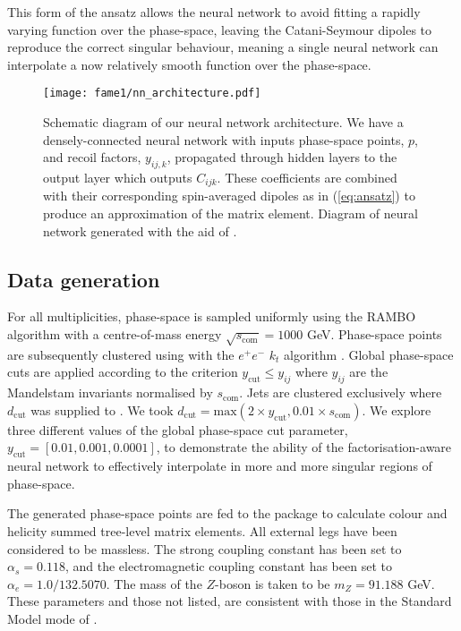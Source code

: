 \documentclass[main.tex]{subfiles}
\begin{document}
This form of the ansatz allows the neural network to avoid fitting a rapidly varying function over the phase-space, leaving the Catani-Seymour dipoles to reproduce the correct singular behaviour, meaning a single neural network can interpolate a now relatively smooth function over the phase-space.

\begin{figure}
    \texttt{[image: fame1/nn\_architecture.pdf]}
    \caption{Schematic diagram of our neural network architecture.
    We have a densely-connected neural network with inputs phase-space points, $p$, and recoil factors, $y_{ij,k}$, propagated through hidden layers to the output layer which outputs $C_{ijk}$.
    These coefficients are combined with their corresponding spin-averaged dipoles as in (\ref{eq:ansatz}) to produce an approximation of the matrix element.
    Diagram of neural network generated with the aid of \cite{LeNail2019}.}
    \label{fig:nn_architecture}
\end{figure}

\subsection{Data generation}\label{sec:data}
For all multiplicities, phase-space is sampled uniformly using the RAMBO algorithm \cite{Kleiss:1985gy} with a centre-of-mass energy $\sqrt{s_{\mathrm{com}}} = 1000$ GeV.
Phase-space points are subsequently clustered using {\FastJet} \cite{Cacciari:2011ma,noel_dawe_2021_4446849} with the $e^{+}e^{-}$ $k_{t}$ algorithm \cite{Catani:1991hj}.
Global phase-space cuts are applied according to the criterion $y_{\mathrm{cut}} \leq y_{ij}$ where $y_{ij}$ are the Mandelstam invariants normalised by $s_{\mathrm{com}}$.
Jets are clustered exclusively where $d_{\mathrm{cut}}$ was supplied to {\FastJet}. We took $d_{\mathrm{cut}} = \mathrm{max}(2 \times y_{\mathrm{cut}}, 0.01 \times s_{\mathrm{com}})$.
We explore three different values of the global phase-space cut parameter, $y_{\mathrm{cut}} = [0.01, 0.001, 0.0001]$, to demonstrate the ability of the factorisation-aware neural network to effectively interpolate in more and more singular regions of phase-space.

The generated phase-space points are fed to the {\NJet} package \cite{Badger:2012pg} to calculate colour and helicity summed tree-level matrix elements. 
All external legs have been considered to be massless. 
The strong coupling constant has been set to $\alpha_{s} = 0.118$, and the electromagnetic coupling constant has been set to $\alpha_{e} = 1.0 / 132.5070$.
The mass of the $Z$-boson is taken to be $m_{Z} = 91.188$ GeV.
These parameters and those not listed, are consistent with those in the Standard Model mode of \aNLO \cite{Alwall:2014hca}.
\end{document}
